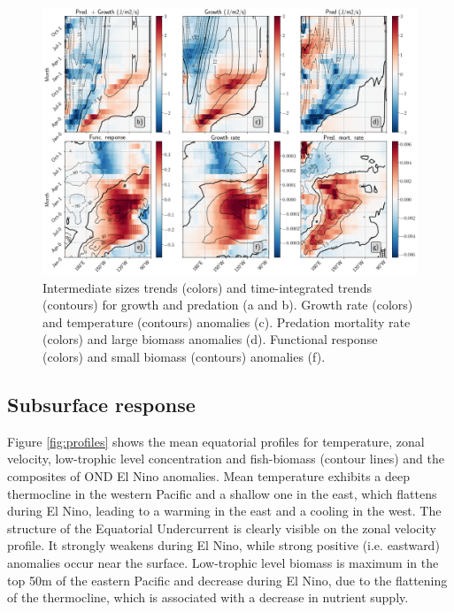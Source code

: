 \begin{figure}[h!tp]
	\centering
	\includegraphics[scale=0.4]{figs/fig9.png}	
	\caption{Intermediate sizes trends (colors) and time-integrated trends (contours) for growth and predation (a and b). Growth rate (colors) and temperature (contours) anomalies (c). Predation mortality rate (colors) and large biomass anomalies (d). Functional response (colors) and small biomass (contours) anomalies (f).}	
	\label{fig:fig9}
\end{figure}



\subsection{Subsurface response}

Figure \ref{fig:profiles} shows the mean equatorial profiles for temperature, zonal velocity, low-trophic level concentration and fish-biomass (contour lines) and the composites of OND El Nino anomalies. Mean temperature exhibits a deep thermocline in the western Pacific and a shallow one in the east, which flattens during El Nino, leading to a warming in the east and a cooling in the west. The structure of the Equatorial Undercurrent is clearly visible on the zonal velocity profile. It strongly weakens during El Nino, while strong positive (i.e. eastward) anomalies occur near the surface. Low-trophic level biomass is maximum in the top 50m of the eastern Pacific and decrease during El Nino, due to the flattening of the thermocline, which is associated with a decrease in nutrient supply.

